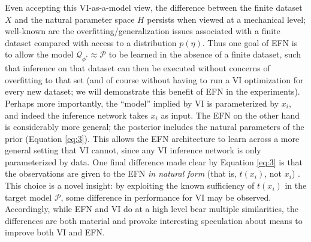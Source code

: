 \documentclass{article}
\begin{document}
Even accepting this VI-as-a-model view, the difference between the finite dataset $X$ and the natural parameter space $H$ persists when viewed at a mechanical level; well-known are the overfitting/generalization issues associated with a finite dataset compared with access to a distribution $p(\eta)$.    Thus one goal of EFN is to allow the model $\mathcal{Q}_{\phi^*} \approx \mathcal{P}$ to be learned in the absence of a finite dataset, such that inference on that dataset can then be executed without concerns of overfitting to that set (and of course without having to run a VI optimization for every new dataset; we will demonstrate this benefit of EFN in the experiments).   Perhaps more importantly, the ``model'' implied by VI is parameterized by $x_i$, and indeed the inference network takes $x_i$ as input. The EFN on the other hand is considerably more general; the posterior includes the natural parameters of the prior (Equation \ref{eq:3}).  This allows the EFN architecture to learn across a more general setting that VI cannot, since any VI inference network is only parameterized by data.  One final difference made clear by Equation \ref{eq:3} is that the observations are given to the EFN \emph{in natural form} (that is, $t(x_i)$, not $x_i$) \citep{robert2007bayesian}.  This choice is a novel insight: by exploiting the known sufficiency of $t(x_i)$ in the target model $\mathcal{P}$, some difference in performance for VI may be observed.  Accordingly, while EFN and VI do at a high level bear multiple similarities, the differences are both material and provoke interesting speculation about means to improve both VI and EFN.
\end{document}
